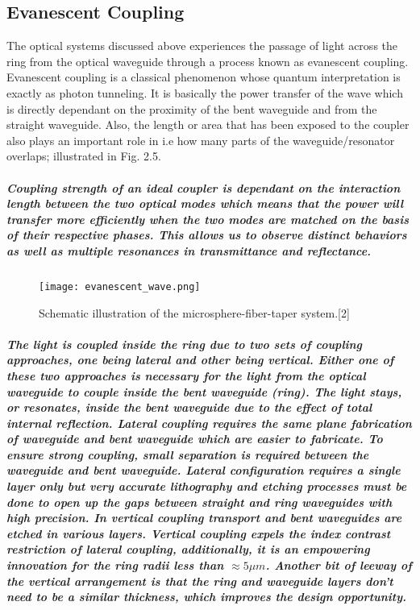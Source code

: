 \subsection{Evanescent Coupling}
The optical systems discussed above experiences the passage of light across the ring from the optical waveguide through a process known as evanescent coupling. Evanescent coupling is a classical phenomenon whose quantum interpretation is exactly as photon tunneling. It is basically the power transfer of the wave which is directly dependant on the proximity of the bent waveguide and from the straight waveguide. Also, the length or area that has been exposed to the coupler also plays an important role in i.e how many parts of the waveguide/resonator overlaps; illustrated in Fig. 2.5.
\subparagraph{\normalfont \large Coupling strength of an ideal coupler is dependant on the interaction length between the two optical modes which means that the power will transfer more efficiently when the two modes are matched on the basis of their respective phases. This allows us to observe distinct behaviors as well as multiple resonances in transmittance and reflectance.} 

\begin{figure}[h]
\centering
\texttt{[image: evanescent\_wave.png]}
\caption{Schematic illustration of the microsphere-fiber-taper
system.[2]}
\end{figure}

\subparagraph{\normalfont \large The light is coupled inside the ring due to two sets of coupling approaches, one being lateral and other being vertical. Either one of these two approaches is necessary for the light from the optical waveguide to couple inside the bent waveguide (ring). The light stays, or resonates, inside the bent waveguide due to the effect of total internal reflection. Lateral coupling requires the same plane fabrication of waveguide and bent waveguide which are easier to fabricate. To ensure strong coupling, small separation is required between the waveguide and bent waveguide. Lateral configuration requires a single layer only but very accurate lithography and etching processes must be done to open up the gaps between straight and ring waveguides with high precision. In vertical coupling transport and bent waveguides are etched in various layers. Vertical coupling expels the index contrast restriction of lateral coupling, additionally, it is an empowering innovation for the ring radii less than $ \approx5 \mu m$. Another bit of leeway of the vertical arrangement is that the ring and waveguide layers don't need to be a similar thickness, which improves the design opportunity.}



